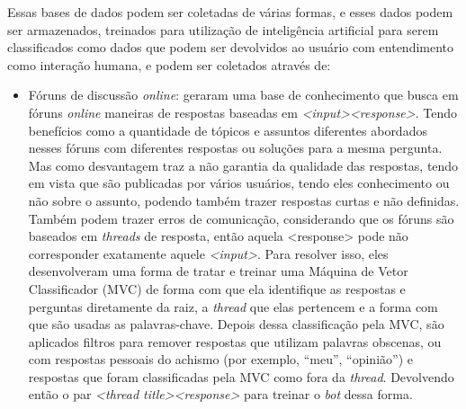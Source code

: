 \documentclass[
	12pt,				%
	oneside,
	a4paper,			%
	english,			%
	french,				%
	spanish,			%
	brazil				%
	]{abntex2}
\begin{document}
Essas bases de dados podem ser coletadas de várias formas, e esses dados podem ser armazenados, treinados para utilização de inteligência artificial para serem classificados como dados que podem ser devolvidos ao usuário com entendimento como interação humana, e podem ser coletados através de:

\begin{itemize}
<<<<<<< HEAD
	\item Fóruns de discussão \emph{online}: \textcite{oline-foruns-database} geraram uma base de conhecimento que busca em fóruns \emph{online} maneiras de respostas baseadas em \emph{<input><response>}. Tendo benefícios como a quantidade de tópicos e assuntos diferentes abordados nesses fóruns com diferentes respostas ou soluções para a mesma pergunta. Mas como desvantagem traz a não garantia da qualidade das respostas, tendo em vista que são publicadas por vários usuários, tendo eles conhecimento ou não sobre o assunto, podendo também trazer respostas curtas e não definidas. Também podem trazer erros de comunicação, considerando que os fóruns são baseados em \emph{threads} de resposta, então aquela <response> pode não corresponder exatamente aquele \emph{<input>}. Para resolver isso, eles desenvolveram uma forma de tratar e treinar uma Máquina de Vetor Classificador (MVC) de forma com que ela identifique as respostas e perguntas diretamente da raiz, a \emph{thread} que elas pertencem e a forma com que são usadas as palavras-chave. Depois dessa classificação pela MVC, são aplicados filtros para remover respostas que utilizam palavras obscenas, ou com respostas pessoais do achismo (por exemplo, “meu”, “opinião”) e respostas que foram classificadas pela MVC como fora da \emph{thread}. Devolvendo então o par \emph{<thread title><response>} para treinar o \emph{bot} dessa forma.


\end{itemize}
\end{document}
